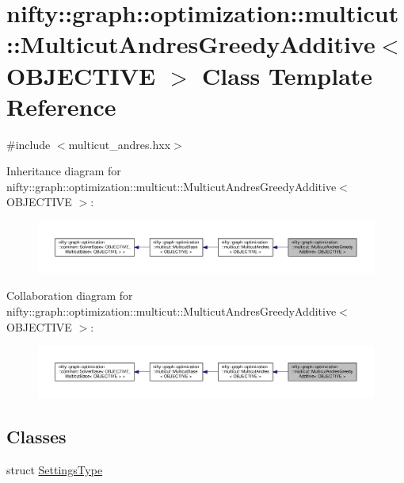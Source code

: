 \hypertarget{classnifty_1_1graph_1_1optimization_1_1multicut_1_1MulticutAndresGreedyAdditive}{}\section{nifty\+:\+:graph\+:\+:optimization\+:\+:multicut\+:\+:Multicut\+Andres\+Greedy\+Additive$<$ O\+B\+J\+E\+C\+T\+I\+V\+E $>$ Class Template Reference}
\label{classnifty_1_1graph_1_1optimization_1_1multicut_1_1MulticutAndresGreedyAdditive}


{\ttfamily \#include $<$multicut\+\_\+andres.\+hxx$>$}



Inheritance diagram for nifty\+:\+:graph\+:\+:optimization\+:\+:multicut\+:\+:Multicut\+Andres\+Greedy\+Additive$<$ O\+B\+J\+E\+C\+T\+I\+V\+E $>$\+:\nopagebreak
\begin{figure}[H]
\begin{center}
\leavevmode
\includegraphics[width=350pt]{classnifty_1_1graph_1_1optimization_1_1multicut_1_1MulticutAndresGreedyAdditive__inherit__graph}
\end{center}
\end{figure}


Collaboration diagram for nifty\+:\+:graph\+:\+:optimization\+:\+:multicut\+:\+:Multicut\+Andres\+Greedy\+Additive$<$ O\+B\+J\+E\+C\+T\+I\+V\+E $>$\+:\nopagebreak
\begin{figure}[H]
\begin{center}
\leavevmode
\includegraphics[width=350pt]{classnifty_1_1graph_1_1optimization_1_1multicut_1_1MulticutAndresGreedyAdditive__coll__graph}
\end{center}
\end{figure}
\subsection*{Classes}
\begin{DoxyCompactItemize}
\item 
struct \hyperlink{structnifty_1_1graph_1_1optimization_1_1multicut_1_1MulticutAndresGreedyAdditive_1_1SettingsType}{Settings\+Type}
\end{DoxyCompactItemize}
